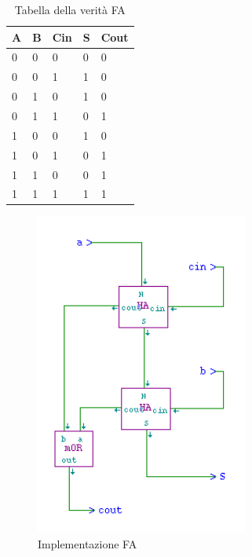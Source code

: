 \documentclass[10pt]{article}
\begin{document}
\begin{itemize}
\begin{table}[H]
    \begin{minipage}[b]{0.4\textwidth}
    \centering
    \begin{tabular}{|l|l|l|l|l|}
        \hline
        \textbf{A} & \textbf{B} & \textbf{Cin} & \textbf{S} & \textbf{Cout} \\ \hline
        0          & 0          & 0            & 0          & 0             \\ 
        0          & 0          & 1            & 1          & 0             \\ 
        0          & 1          & 0            & 1          & 0             \\ 
        0          & 1          & 1            & 0          & 1             \\ 
        1          & 0          & 0            & 1          & 0             \\ 
        1          & 0          & 1            & 0          & 1             \\ 
        1          & 1          & 0            & 0          & 1             \\ 
        1          & 1          & 1            & 1          & 1             \\ \hline
        \end{tabular}
        \caption{Tabella della verità FA}
        \label{table:student}
    \end{minipage}
    \end{table}
    
    \begin{figure}[H]
    \begin{minipage}[b]{0.4\textwidth}
    \centering
    \includegraphics[width=70mm]{FA}
    \caption{Implementazione FA}
    \label{ }
    \end{minipage}
    \end{figure}


\end{itemize}
\end{document}
